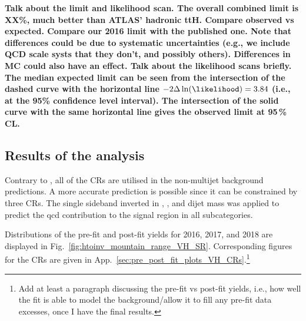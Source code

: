 \textbf{Talk about the limit and likelihood scan. The overall combined limit is XX\%, much better than ATLAS' hadronic ttH. Compare observed vs expected. Compare our 2016 limit with the published one. Note that differences could be due to systematic uncertainties (e.g., we include QCD scale systs that they don't, and possibly others). Differences in MC could also have an effect. Talk about the likelihood scans briefly. The median expected limit can be seen from the intersection of the dashed curve with the horizontal line $-\text{2}\Delta \ln(\likelihood) = \text{3.84}$ (i.e., at the 95\% confidence level interval). The intersection of the solid curve with the same horizontal line gives the observed limit at 95\,\% CL.}

\clearpage




\subsection{Results of the \texorpdfstring{\VH}{VH} analysis}
\label{subsec:htoinv_analysis_VH}

Contrary to \ttH, all of the \glspl{CR} are utilised in the non-multijet background predictions. A more accurate \ztonunu prediction is possible since it can be constrained by three \glspl{CR}. The single sideband inverted in \mindphi, \omegaTilde, and dijet mass was applied to predict the \acrshort{qcd} contribution to the signal region in all \VH subcategories.

Distributions of the pre-fit and post-fit yields for 2016, 2017, and 2018 are displayed in Fig.~\ref{fig:htoinv_mountain_range_VH_SR}. Corresponding figures for the \glspl{CR} are given in App.~\ref{sec:pre_post_fit_plots_VH_CRs}.\footnote{Add at least a paragraph discussing the pre-fit vs post-fit yields, i.e., how well the fit is able to model the background/allow it to fill any pre-fit data excesses, once I have the final results.}

